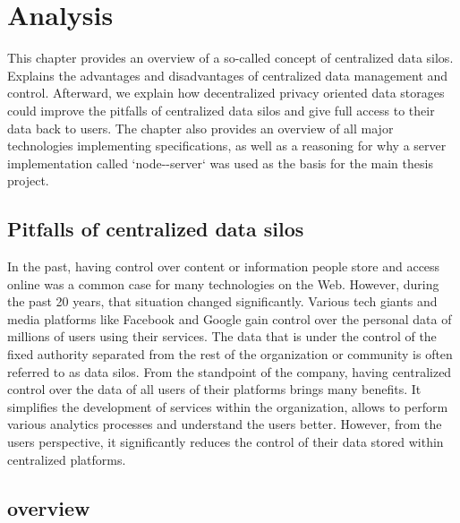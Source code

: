 \chapter{Analysis}
\label{chap:num_3}


This chapter provides an overview of a so-called concept of centralized data silos. Explains the advantages and disadvantages of centralized data management and control. Afterward, we explain how decentralized privacy oriented data storages could improve the pitfalls of centralized data silos and give full access to their data back to users. The chapter also provides an overview of all major technologies implementing \solid{} specifications, as well as a reasoning for why a server implementation called `node-\solid{}-server` was used as the basis for the main thesis project. 


\section{Pitfalls of centralized data silos}

In the past, having control over content or information people store and access online was a common case for many technologies on the Web. However, during the past 20 years, that situation changed significantly. Various tech giants and media platforms like Facebook and Google gain control over the personal data of millions of users using their services. The data that is under the control of the fixed authority separated from the rest of the organization or community is often referred to as data silos.  From the standpoint of the company, having centralized control over the data of all users of their platforms brings many benefits. It simplifies the development of services within the organization, allows to perform various analytics processes and understand the users better. However, from the users perspective, it significantly reduces the control of their data stored within centralized platforms.

\section{\solid{} overview}

